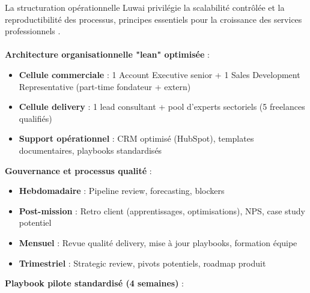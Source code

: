 La structuration opérationnelle Luwai privilégie la scalabilité contrôlée et la reproductibilité des processus, principes essentiels pour la croissance des services professionnels \cite{maister2012managing}.
\\\\
\textbf{Architecture organisationnelle "lean" optimisée} :
\begin{itemize}
    \item \textbf{Cellule commerciale} : 1 Account Executive senior + 1 Sales Development Representative (part-time fondateur + extern)
    \item \textbf{Cellule delivery} : 1 lead consultant + pool d'experts sectoriels (5 freelances qualifiés)
    \item \textbf{Support opérationnel} : CRM optimisé (HubSpot), templates documentaires, playbooks standardisés
\end{itemize}
\medskip
\textbf{Gouvernance et processus qualité} :
\begin{itemize}
    \item \textbf{Hebdomadaire} : Pipeline review, forecasting, blockers
    \item \textbf{Post-mission} : Retro client (apprentissages, optimisations), NPS, case study potentiel
    \item \textbf{Mensuel} : Revue qualité delivery, mise à jour playbooks, formation équipe
    \item \textbf{Trimestriel} : Strategic review, pivots potentiels, roadmap produit
\end{itemize}
\medskip
\textbf{Playbook pilote standardisé (4 semaines)} :


